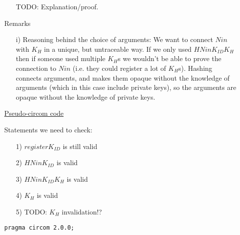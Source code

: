 \documentclass{article}
\newcommand{\khk}{K_{H}}
\newcommand{\kid}{K_{ID}}
\begin{document}
\begin{enumerate}[leftmargin=0cm]
\begin{itemize}
		TODO: Explanation/proof.
	\end{itemize}
	
	\item[] Remarks
	\begin{itemize}
	\item[i)] Reasoning behind the choice of arguments:
	We want to connect $Nin$ with $\khk$ in a unique, but untraceable way.
	If we only used $HNin\kid\khk$ then if someone used multiple $\khk$s we wouldn't be able to prove the connection to $Nin$ (i.e. they could register a lot of $\khk$s).
	Hashing connects arguments, and makes them opaque without the knowledge of arguments (which in this case include private keys), so the arguments are opaque without the knowledge of private keys.
	\end{itemize}

\item[] \underline{Pseudo-circom code}

Statements we need to check:
\begin{itemize}
	\item[1)] $register\kid$ is still valid
	\item[2)] $HNin\kid$ is valid
	\item[3)] $HNin\kid\khk$ is valid
	\item[4)] $\khk$ is valid
	\item[5)] TODO: $\khk$ invalidation!?
\end{itemize}

\begin{lstlisting}[language=circom]
	pragma circom 2.0.0;
\end{lstlisting}

\end{enumerate}

\newpage
\end{document}
